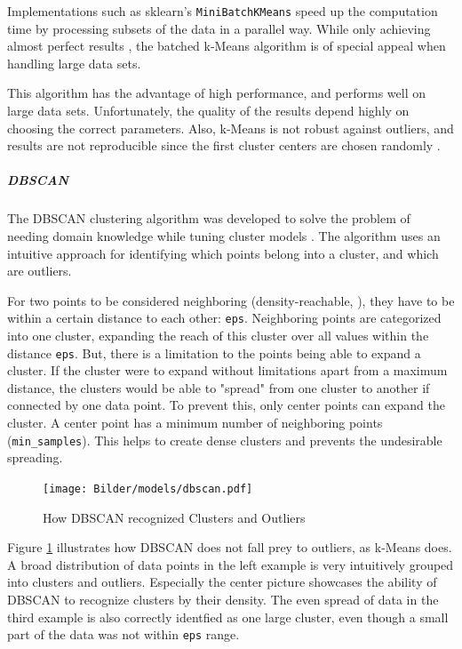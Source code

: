 		Implementations such as \ac{sklearn}'s \lstinline|MiniBatchKMeans| \cite{sklearn} speed up the computation time by processing subsets of the data in a parallel way. While only achieving almost perfect results \cite{sculleyWebscaleKmeansClustering2010}, the batched k-Means algorithm is of special appeal when handling large data sets.
		
		This algorithm has the advantage of high performance, and performs well on large data sets. Unfortunately, the quality of the results depend highly on choosing the correct parameters. Also, k-Means is not robust against outliers, and results are not reproducible since the first cluster centers are chosen randomly \cite[c.6.2]{40algorithms}.
		
		\subparagraph{\acl{DBSCAN}}
		The \ac{DBSCAN} clustering algorithm was developed to solve the problem of needing domain knowledge while tuning cluster models \cite{DBSCAN}. The algorithm uses an intuitive approach for identifying which points belong into a cluster, and which are outliers.

		For two points to be considered neighboring (density-reachable, \cite{DBSCAN}), they have to be within a certain distance to each other: \lstinline|eps|. Neighboring points are categorized into one cluster, expanding the reach of this cluster over all values within the distance \lstinline|eps|.
		But, there is a limitation to the points being able to expand a cluster. If the cluster were to expand without limitations apart from a maximum distance, the clusters would be able to "spread" from one cluster to another if connected by one data point.
		To prevent this, only center points can expand the cluster. A center point has a minimum number of neighboring points (\lstinline|min_samples|). This helps to create dense clusters and prevents the undesirable spreading.
		
		 \begin{figure}[!h]
			\centering
			\texttt{[image: Bilder/models/dbscan.pdf]}
			\caption{How DBSCAN recognized Clusters and Outliers \cite{sklearn}}
			\label{fig:dbscan-viz}
		\end{figure}
	
		Figure \ref{fig:dbscan-viz} illustrates how \ac{DBSCAN} does not fall prey to outliers, as k-Means does. A broad distribution of data points in the left example is very intuitively grouped into clusters and outliers. Especially the center picture showcases the ability of DBSCAN to recognize clusters by their density. The even spread of data in the third example is also correctly identfied as one large cluster, even though a small part of the data was not within \lstinline|eps| range.
		
